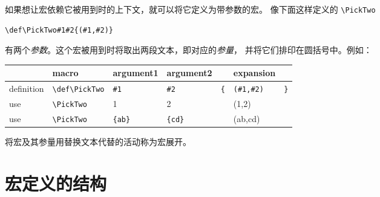 \documentclass[letterpaper]{book}
\begin{document}
如果想让宏依赖它被用到时的上下文，就可以将它定义为带参数的宏。
像下面这样定义的 \verb+\PickTwo+
\begin{verbatim}
\def\PickTwo#1#2{(#1,#2)}
\end{verbatim}
有两个\emph{参数}。这个宏被用到时将取出两段文本，即对应的\emph{参量}，
并将它们排印在圆括号中。例如：

\begin{tabular}{|l|llllll|}
\hline
          &macro              &argument1& argument2& 
    &expansion&\\ \hline
definition&\verb+\def\PickTwo+&\verb+#1+& \verb+#2+& \verb+{+& 
    \verb+(#1,#2)+& \verb+}+\\
use&       \verb+\PickTwo+&1&2&&(1,2)&\\
use&       \verb+\PickTwo+&\verb+{ab}+&\verb+{cd}+&&(ab,cd)&\\
\hline
\end{tabular}

将宏及其参量用替换文本代替的活动称为{\italic 宏展开}。

\section{宏定义的结构}
\end{document}
